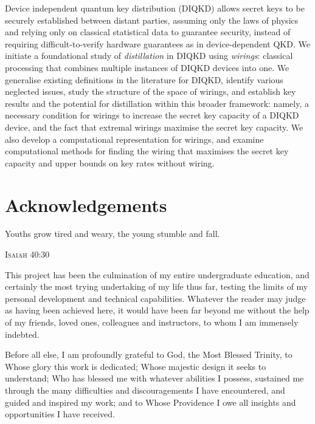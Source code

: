 \documentclass[10pt, a4paper]{article}
\numberwithin{equation}{section} %
\theoremstyle{definition}
\theoremstyle{plain}
\newcommand{\?}{\mathrel{?}} %
\begin{document}
    Device independent quantum key distribution (DIQKD) allows secret keys to be securely established between distant parties, assuming only the laws of physics and relying only on classical statistical data to guarantee security, instead of requiring difficult-to-verify hardware guarantees as in device-dependent QKD\@. We initiate a foundational study of \emph{distillation} in DIQKD using \emph{wirings}: classical processing that combines multiple instances of DIQKD devices into one. We generalise existing definitions in the literature for DIQKD, identify various neglected issues, study the structure of the space of wirings, and establish key results and the potential for distillation within this broader framework: namely, a necessary condition for wirings to increase the secret key capacity of a DIQKD device, and the fact that extremal wirings maximise the secret key capacity. We also develop a computational representation for wirings, and examine computational methods for finding the wiring that maximises the secret key capacity and upper bounds on key rates without wiring.

    \clearpage

    \section*{Acknowledgements}
    \epigraph{Youths grow tired and weary, the young stumble and fall.}{\textsc{Isaiah} 40:30}

    This project has been the culmination of my entire undergraduate education, and certainly the most trying undertaking of my life thus far, testing the limits of my personal development and technical capabilities. Whatever the reader may judge as having been achieved here, it would have been far beyond me without the help of my friends, loved ones, colleagues and instructors, to whom I am immensely indebted.

    Before all else, I am profoundly grateful to God, the Most Blessed Trinity, to Whose glory this work is dedicated; Whose majestic design it seeks to understand; Who has blessed me with whatever abilities I possess, sustained me through the many difficulties and discouragements I have encountered, and guided and inspired my work; and to Whose Providence I owe all insights and opportunities I have received.
\end{document}
